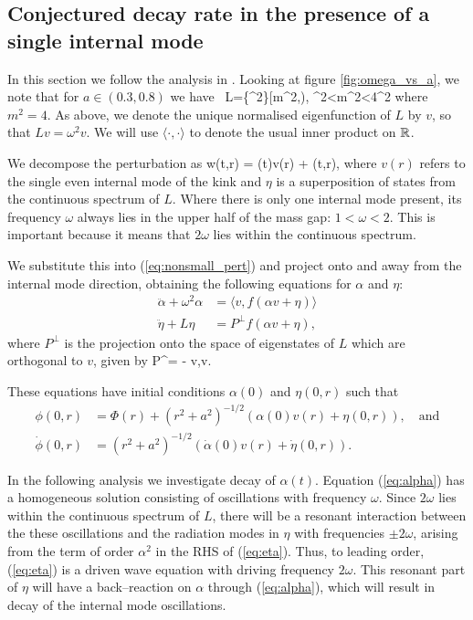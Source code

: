\subsection{Conjectured decay rate in the presence of a single internal mode} \label{sec:conjecture}
In this section we follow the analysis in \cite{SG}. Looking at figure \ref{fig:omega_vs_a}, we note that for $a\in(0.3,0.8)$ we have
\be \label{eq:spec_L}
\ L=\{\omega^2\}\cap [m^2,\infty), \qquad \omega^2<m^2<4\omega^2
\ee
where $m^2=4$. As above, we denote the unique normalised eigenfunction of $L$ by $v$, so that $Lv=\omega^2v$. We will use $\langle\cdot,\cdot\rangle$ to denote the usual inner product on $\mathbb{R}$.

We decompose the perturbation as
\be
w(t,r) = \alpha(t)v(r) + \eta(t,r),
\ee
where $v(r)$ refers to the single even internal mode of the kink and $\eta$ is a superposition of states from the continuous spectrum of $L$. Where there is only one internal mode present, its frequency $\omega$ always lies in the upper half of the mass gap: $1<\omega<2$. This is important because it means that $2\omega$ lies within the continuous spectrum.

We substitute this into (\ref{eq:nonsmall_pert}) and project onto and away from the internal mode direction, obtaining the following equations for $\alpha$ and $\eta$:
\begin{align}
\ddot{\alpha} + \omega^2\alpha &= \langle v, f(\alpha v + \eta) \rangle \label{eq:alpha}\\
\ddot{\eta} + L\eta &= P^\perp f(\alpha v + \eta),\label{eq:eta}
\end{align}
where $P^\perp$ is the projection onto the space of eigenstates of $L$ which are orthogonal to $v$, given by
\be \label{eq:Pperp}
P^\perp\psi = \psi - \langle v,\psi\rangle v.
\ee

These equations have initial conditions $\alpha(0)$ and $\eta(0,r)$ such that
\begin{align*}
\phi(0,r) &= \Phi(r) + (r^2+a^2)^{-1/2}(\alpha(0)v(r) + \eta(0,r)), \quad \mathrm{and} \\
\dot{\phi}(0,r) &= (r^2+a^2)^{-1/2}(\dot{\alpha}(0)v(r) + \dot{\eta}(0,r)).
\end{align*}

In the following analysis we investigate decay of $\alpha(t)$. Equation (\ref{eq:alpha}) has a homogeneous solution consisting of oscillations with frequency $\omega$. Since $2\omega$ lies within the continuous spectrum of $L$, there will be a resonant interaction between the these oscillations and the radiation modes in $\eta$ with frequencies $\pm 2 \omega$, arising from the term of order $\alpha^2$ in the RHS of (\ref{eq:eta}). Thus, to leading order, (\ref{eq:eta}) is a driven wave equation with driving frequency $2\omega$. This resonant part of $\eta$ will have a back--reaction on $\alpha$ through (\ref{eq:alpha}), which will result in decay of the internal mode oscillations.


